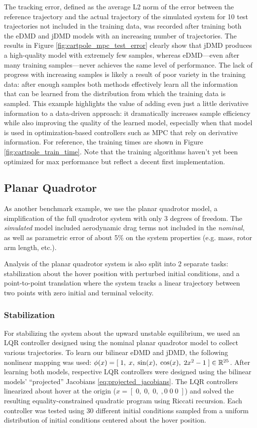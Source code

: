 \documentclass{article}
\begin{document}
The tracking error, defined as the average L2 norm of the error between the reference 
trajectory and the actual trajectory of the simulated system for 10 test trajectories not 
included in the training data, was recorded after training both the eDMD and jDMD models
with an increasing number of trajectories. The results in Figure
\ref{fig:cartpole_mpc_test_error} clearly show that jDMD produces a high-quality model with
extremely few samples, whereas eDMD---even after many training samples---never achieves the 
same level of performance. The lack of progress with increasing samples is likely a result 
of poor variety in the training data: after enough samples both methods effectively learn 
all the information that can be learned from the distribution from which the training data 
is sampled. This example highlights the value of adding even just a little derivative 
information to a data-driven approach: it dramatically increases sample efficiency while 
also improving the quality of the learned model, especially when that model is used in 
optimization-based controllers such as MPC that rely on derivative information. For 
reference, the training times are shown in Figure \ref{fig:cartpole_train_time}. Note that 
the training algorithms haven't yet been optimized for max performance but reflect a decent 
first implementation.


\subsection{Planar Quadrotor}
As another benchmark example, we use the planar quadrotor model, a simplification of the
full quadrotor system with only 3 degrees of freedom. The \textit{simulated} model included
aerodynamic drag terms not included in the \textit{nominal}, as well as parametric error of 
about 5\% on the system properties (e.g. mass, rotor arm length, etc.).

Analysis of the planar quadrotor system is also split into 2 separate tasks: stabilization
about the hover position with perturbed initial conditions, and a point-to-point translation
where the system tracks a linear trajectory between two points with zero initial and 
terminal velocity.

\subsubsection{Stabilization}

For stabilizing the system about the upward unstable equilibrium, we used an LQR controller
designed using the nominal planar quadrotor model to collect various trajectories. To learn
our bilinear eDMD and jDMD, the following nonlinear mapping was used: $\phi(x) = [\; 1,\;
x,\; \sin(x),\; \cos(x),\; 2x^{2}-1\; ] \in \mathbb{R}^{25}$. After learning both models, respective
LQR controllers were designed using the bilinear models' ``projected'' Jacobians
\eqref{eq:projected_jacobians}. The LQR controllers linearized about hover at the origin ($x
= [\;0,\; 0,\; 0,\;, 0\;  0\;  0\;]$) and solved the resulting equality-constrained
quadratic program using Riccati recursion. Each controller was tested using 30 different
initial conditions sampled from a uniform distribution of initial conditions centered about
the hover position.
\end{document}

